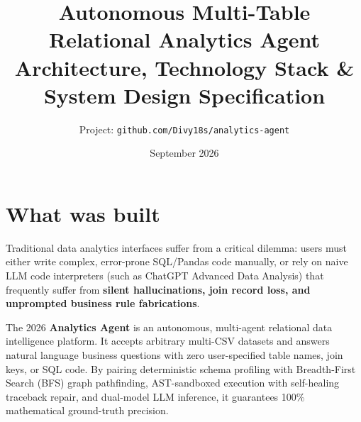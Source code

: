 \documentclass[11pt,a4paper]{article}
\title{Autonomous Multi-Table Relational Analytics Agent\\{\large Architecture, Technology Stack \& System Design Specification}}
\author{Project: \texttt{github.com/Divy18s/analytics-agent}}
\date{September 2026}
\begin{document}
\maketitle
\tableofcontents
\newpage

\section{What was built}
Traditional data analytics interfaces suffer from a critical dilemma: users must either write complex, error-prone SQL/Pandas code manually, or rely on naive LLM code interpreters (such as ChatGPT Advanced Data Analysis) that frequently suffer from \textbf{silent hallucinations, join record loss, and unprompted business rule fabrications}. 

The 2026 \textbf{Analytics Agent} is an autonomous, multi-agent relational data intelligence platform. It accepts arbitrary multi-CSV datasets and answers natural language business questions with zero user-specified table names, join keys, or SQL code. By pairing deterministic schema profiling with Breadth-First Search (BFS) graph pathfinding, AST-sandboxed execution with self-healing traceback repair, and dual-model LLM inference, it guarantees 100\% mathematical ground-truth precision.
\end{document}
